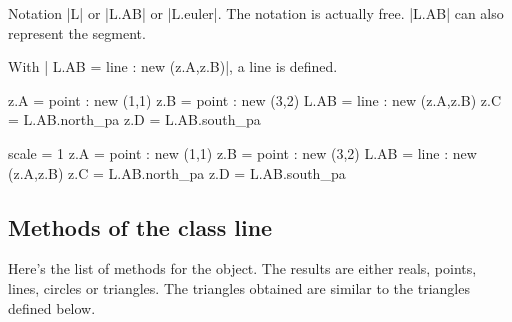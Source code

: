 Notation |L| or |L.AB| or |L.euler|. The notation is actually free.
|L.AB| can also represent the segment. 

With | L.AB  = line : new (z.A,z.B)|, a line is defined.


\begin{minipage}{0.5\textwidth}
\begin{tkzexample}[latex=0cm,small,code only]
\begin{tkzelements}
   z.A   = point : new (1,1)
   z.B   = point : new (3,2)
   L.AB  = line : new (z.A,z.B)
   z.C   = L.AB.north_pa
   z.D   = L.AB.south_pa
\end{tkzelements}
\end{tkzexample}
\end{minipage}
\begin{minipage}{0.5\textwidth}
\begin{tkzelements}
   scale = 1
   z.A   = point : new (1,1)
   z.B   = point : new (3,2)
   L.AB  = line : new (z.A,z.B)
   z.C   = L.AB.north_pa
   z.D   = L.AB.south_pa
\end{tkzelements}
\end{minipage}

\newpage
\subsection{Methods of the class line} %
\label{sub:methods_from_class_line}
Here's the list of methods for the  object. The results are either reals, points, lines, circles or triangles. The triangles obtained are similar to the triangles defined below.

